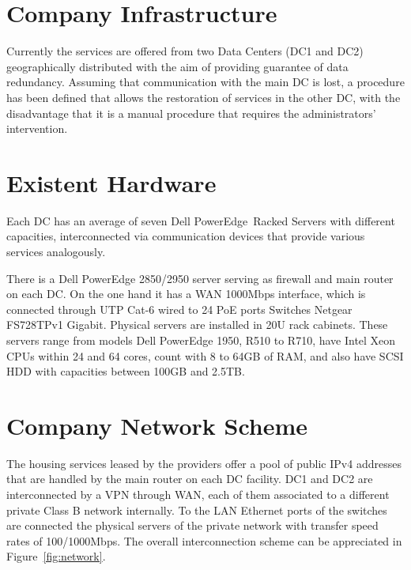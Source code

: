 \documentclass[a4paper, 12pt]{book}
\begin{document}
\section{Company Infrastructure}
\label{sec:infrastructure}

Currently the services are offered from two Data Centers (DC1 and DC2) geographically distributed with the aim of providing guarantee of data redundancy. Assuming that communication with the main DC is lost, a procedure has been defined that allows the restoration of services in the other DC, with the disadvantage that it is a manual procedure that requires the  administrators' intervention.

\section{Existent Hardware}
\label{sec:hardware}

Each DC has an average of seven Dell PowerEdge\texttrademark \ Racked Servers with different capacities, interconnected via communication devices that provide various services analogously.\bigskip

\noindent There is a Dell PowerEdge 2850/2950 server serving as firewall and main router on each DC. On the one hand it has a WAN 1000Mbps interface, which is connected through UTP Cat-6 wired to 24 PoE ports Switches Netgear FS728TPv1 Gigabit. Physical servers are installed in 20U rack cabinets. These servers range from models Dell PowerEdge 1950, R510 to R710, have Intel Xeon CPUs within 24 and 64 cores, count with 8 to 64GB of RAM, and also have SCSI HDD with capacities between 100GB and 2.5TB.


\section{Company Network Scheme}
\label{sec:networkscheme}

The housing services leased by the providers offer a pool of public IPv4 addresses that are handled by the main router on each DC facility. DC1 and DC2 are interconnected by a VPN through WAN, each of them associated to a different private Class B network internally. To the LAN Ethernet ports of the switches are connected the physical servers of the private network with transfer speed rates of 100/1000Mbps. The overall interconnection scheme can be appreciated in Figure~\ref{fig:network}.\\
\end{document}
